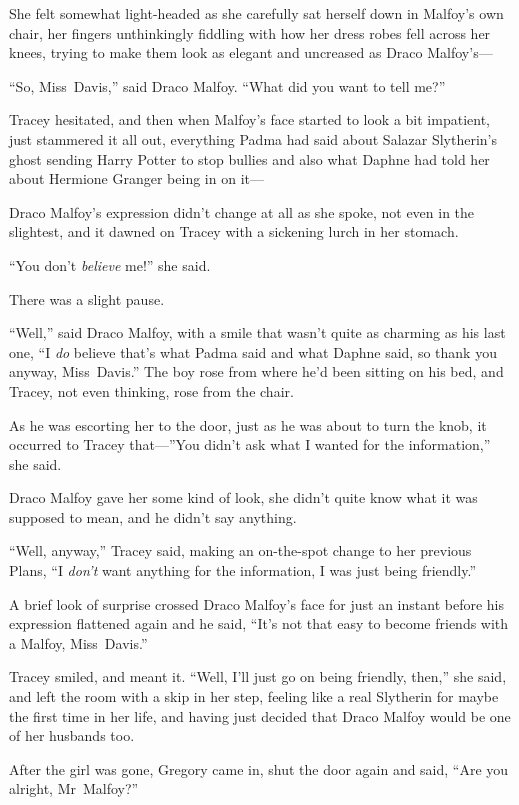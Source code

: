She felt somewhat light-headed as she carefully sat herself down in Malfoy’s own chair, her fingers unthinkingly fiddling with how her dress robes fell across her knees, trying to make them look as elegant and uncreased as Draco Malfoy’s—

“So, Miss~Davis,” said Draco Malfoy. “What did you want to tell me?”

Tracey hesitated, and then when Malfoy’s face started to look a bit impatient, just stammered it all out, everything Padma had said about Salazar Slytherin’s ghost sending Harry Potter to stop bullies and also what Daphne had told her about Hermione Granger being in on it—

Draco Malfoy’s expression didn’t change at all as she spoke, not even in the slightest, and it dawned on Tracey with a sickening lurch in her stomach.

“You don’t \emph{believe} me!” she said.

There was a slight pause.

“Well,” said Draco Malfoy, with a smile that wasn’t quite as charming as his last one, “I \emph{do} believe that’s what Padma said and what Daphne said, so thank you anyway, Miss~Davis.” The boy rose from where he’d been sitting on his bed, and Tracey, not even thinking, rose from the chair.

As he was escorting her to the door, just as he was about to turn the knob, it occurred to Tracey that—”You didn’t ask what I wanted for the information,” she said.

Draco Malfoy gave her some kind of look, she didn’t quite know what it was supposed to mean, and he didn’t say anything.

“Well, anyway,” Tracey said, making an on-the-spot change to her previous Plans, “I \emph{don’t} want anything for the information, I was just being friendly.”

A brief look of surprise crossed Draco Malfoy’s face for just an instant before his expression flattened again and he said, “It’s not that easy to become friends with a Malfoy, Miss~Davis.”

Tracey smiled, and meant it. “Well, I’ll just go on being friendly, then,” she said, and left the room with a skip in her step, feeling like a real Slytherin for maybe the first time in her life, and having just decided that Draco Malfoy would be one of her husbands too.

\later

After the girl was gone, Gregory came in, shut the door again and said, “Are you alright, Mr~Malfoy?”

